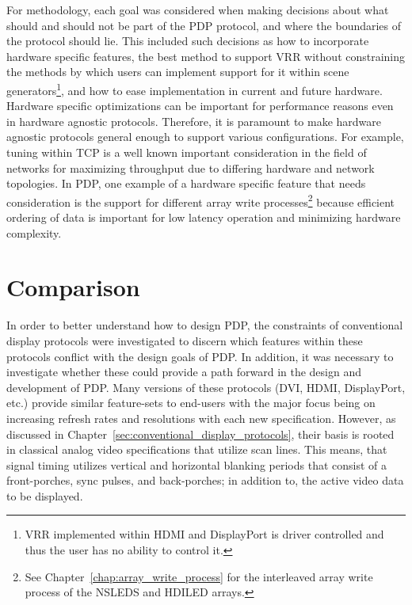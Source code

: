     For methodology, each goal was considered when making decisions about what should and should not be part of the PDP protocol, and where the boundaries of the protocol should lie. This included such decisions as how to incorporate hardware specific features, the best method to support VRR without constraining the methods by which users can implement support for it within scene generators\footnote{VRR implemented within HDMI and DisplayPort is driver controlled and thus the user has no ability to control it.}, and how to ease implementation in current and future hardware. Hardware specific optimizations can be important for performance reasons even in hardware agnostic protocols. Therefore, it is paramount to make hardware agnostic protocols general enough to support various configurations. For example, tuning within TCP\cite{WeigleFeng2002} is a well known important consideration in the field of networks for maximizing throughput due to differing hardware and network topologies. In PDP, one example of a hardware specific feature that needs consideration is the support for different array write processes\footnote{See Chapter~\ref{chap:array_write_process} for the interleaved array write process of the NSLEDS and HDILED arrays.} because efficient ordering of data is important for low latency operation and minimizing hardware complexity.

\section{Comparison}

    In order to better understand how to design PDP, the constraints of conventional display protocols were investigated to discern which features within these protocols conflict with the design goals of PDP. In addition, it was necessary to investigate whether these could provide a path forward in the design and development of PDP. Many versions of these protocols (DVI\cite{DDWG1999}, HDMI\cite{HDMIForum2018}, DisplayPort\cite{VESA2016}, etc.) provide similar feature-sets to end-users with the major focus being on increasing refresh rates and resolutions with each new specification. However, as discussed in Chapter~\ref{sec:conventional_display_protocols}, their basis is rooted in classical analog video specifications that utilize scan lines\cite{Neal1998}. This means, that signal timing utilizes vertical and horizontal blanking periods that consist of a front-porches, sync pulses, and back-porches; in addition to, the active video data to be displayed.

